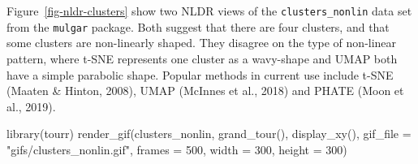 \documentclass[
  letterpaper,
]{krantz}
\newenvironment{Shaded}{\begin{snugshade}}{\end{snugshade}}
\newcommand{\AttributeTok}[1]{\textcolor[rgb]{0.40,0.45,0.13}{#1}}
\newcommand{\DecValTok}[1]{\textcolor[rgb]{0.68,0.00,0.00}{#1}}
\newcommand{\FunctionTok}[1]{\textcolor[rgb]{0.28,0.35,0.67}{#1}}
\newcommand{\NormalTok}[1]{\textcolor[rgb]{0.00,0.23,0.31}{#1}}
\newcommand{\StringTok}[1]{\textcolor[rgb]{0.13,0.47,0.30}{#1}}
\begin{document}
Figure~\ref{fig-nldr-clusters} show two NLDR views of the
\texttt{clusters\_nonlin} data set from the \texttt{mulgar} package.
Both suggest that there are four clusters, and that some clusters are
non-linearly shaped. They disagree on the type of non-linear pattern,
where t-SNE represents one cluster as a wavy-shape and UMAP both have a
simple parabolic shape. Popular methods in current use include t-SNE
(Maaten \& Hinton, 2008), UMAP (McInnes et al., 2018) and PHATE (Moon et
al., 2019).

\begin{Shaded}
\begin{Highlighting}[]
\FunctionTok{library}\NormalTok{(tourr)}
\FunctionTok{render\_gif}\NormalTok{(clusters\_nonlin, }
           \FunctionTok{grand\_tour}\NormalTok{(),}
           \FunctionTok{display\_xy}\NormalTok{(),}
           \AttributeTok{gif\_file =} \StringTok{"gifs/clusters\_nonlin.gif"}\NormalTok{,}
           \AttributeTok{frames =} \DecValTok{500}\NormalTok{,}
           \AttributeTok{width =} \DecValTok{300}\NormalTok{, }
           \AttributeTok{height =} \DecValTok{300}\NormalTok{)}
\end{Highlighting}
\end{Shaded}
\end{document}
